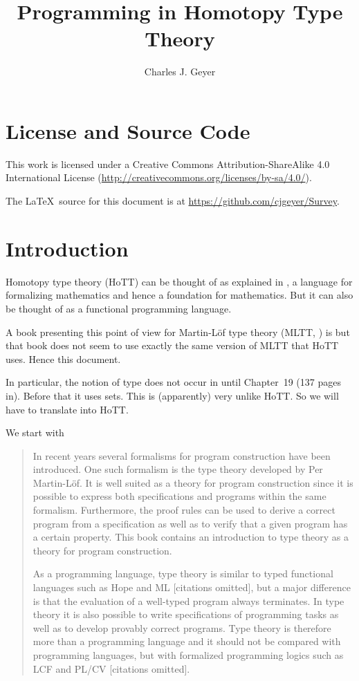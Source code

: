 \documentclass[11pt]{article}
\begin{document}
\title{Programming in Homotopy Type Theory}
\author{Charles J. Geyer}
\maketitle

\tableofcontents

\section{License and Source Code}

This work is licensed under a Creative Commons
Attribution-ShareAlike 4.0 International License
(\url{http://creativecommons.org/licenses/by-sa/4.0/}).

The \LaTeX\ source for this document is
at \url{https://github.com/cjgeyer/Survey}.

\pagebreak[3]
\section{Introduction}

Homotopy type theory (HoTT) can be thought of as explained in
\citet[hereinafter referred to as the HoTT book]{hott-book},
a language for formalizing mathematics and hence a foundation for mathematics.
But it can also be thought of as a functional programming language.

A book presenting this point of view for Martin-L\"{o}f type theory (MLTT,
\citealp{martin-lof-mltt}) is \citet*{programming-mltt} but that book does
not seem to use exactly the same version of MLTT that HoTT uses.  Hence this
document.

In particular, the notion of type does not occur in \citet{programming-mltt}
until Chapter~19 (137 pages in).  Before that it uses sets.  This is
(apparently) very unlike HoTT.  So we will have to translate
\citet{programming-mltt} into HoTT.

We start with \citep[p.~1]{programming-mltt}
\begin{quotation}
In recent years several formalisms for program construction have been
introduced. One such formalism is the type theory developed by
Per Martin-L\"{o}f. It is well suited as a theory for program construction
since it is possible to express
both specifications and programs within the same formalism. Furthermore, the
proof rules can be used to derive a correct program from a specification as
well as to verify that a given program has a certain property.  This book
contains an
introduction to type theory as a theory for program construction.

As a programming language, type theory is similar to typed functional
languages such as Hope and ML [citations omitted], but a major difference
is that the evaluation of a well-typed program always terminates.
In type theory it is also possible
to write specifications of programming tasks as well as to develop provably
correct programs. Type theory is therefore more than a programming language and
it should not be compared with programming languages, but with formalized
programming logics such as LCF and PL/CV [citations omitted].
\end{quotation}
\end{document}
